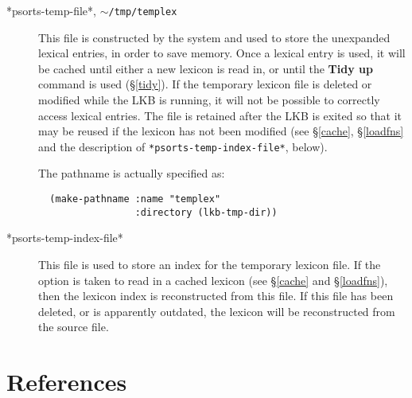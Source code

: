 \documentclass[12pt]{report}
\begin{document}
\begin{description}
\item[*psorts-temp-file*, {\tt $\sim$/tmp/templex}]
This file is constructed by the system and used to store the unexpanded lexical
entries, in order to save memory.  Once a lexical entry is used, it will
be cached until either a new lexicon is read in, or until the {\bf Tidy up}
command is used (\S\ref{tidy}).  If the temporary
lexicon file is deleted or modified while the LKB is running, it will not
be possible to correctly access lexical entries.  The file is retained
after the LKB is exited so that it may be reused if the lexicon has not been 
modified (see \S\ref{cache}, \S\ref{loadfns} and the description of 
\verb+*psorts-temp-index-file*+, below).

The pathname is actually specified as:
\begin{verbatim}
  (make-pathname :name "templex" 
                 :directory (lkb-tmp-dir))
\end{verbatim}

\item[*psorts-temp-index-file*]
This file is used to store an index for the temporary lexicon file.
If the option is taken to read in a cached lexicon (see \S\ref{cache}
and \S\ref{loadfns}),
then the lexicon index is reconstructed from this file.
If this file has been deleted, or is apparently outdated, the lexicon
will be reconstructed from the source file.
\end{description}


\chapter*{References}
\end{document}
